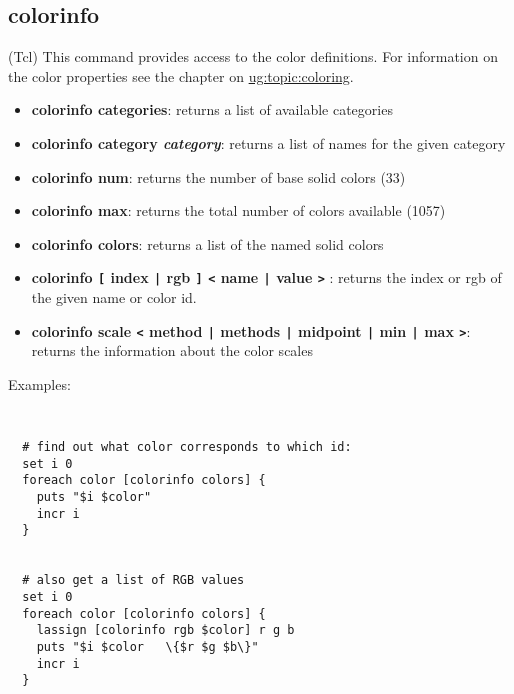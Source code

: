 \subsection{colorinfo}  
\label{ug:ui:text:colorinfo}
(Tcl) This command provides access to the color definitions. For information on
the color properties see the chapter on 
\hyperref{Coloring}{Coloring [\S }{]}{ug:topic:coloring}.

\begin{itemize}
\item {\bf  colorinfo categories}:
     returns a list of available categories

\item {\bf  colorinfo category {\it category}}:
     returns a list of names for the given category

\item {\bf  colorinfo num}:
     returns the number of base solid colors (33)

\item {\bf  colorinfo max}:
     returns the total number of colors available (1057)

\item {\bf  colorinfo colors}:
     returns a list of the named solid colors

\item {\bf  colorinfo {\tt [} index {\tt |} rgb {\tt ]} {\tt <}
       name {\tt |} value {\tt >}} : 
     returns the index or rgb of the given name or color id.  


\item {\bf  colorinfo scale {\tt <} method {\tt |} methods {\tt |} 
	midpoint {\tt |} min {\tt |} max {\tt >}}:
     returns the information about the color scales
\end{itemize}

Examples:

{\tt 
\begin{verbatim}
  # find out what color corresponds to which id:
  set i 0
  foreach color [colorinfo colors] {
    puts "$i $color"
    incr i
  }


  # also get a list of RGB values
  set i 0
  foreach color [colorinfo colors] {
    lassign [colorinfo rgb $color] r g b
    puts "$i $color   \{$r $g $b\}"
    incr i
  }
\end{verbatim}
}

